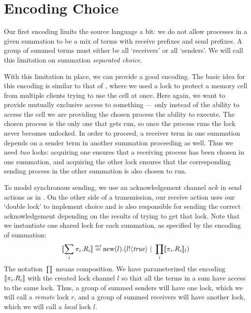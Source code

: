 \section{Encoding Choice}\label{failedencoding}
Our first encoding limits the source language a bit: we do not allow processes in a given summation to be a mix of terms with receive prefixes and send prefixes.  
A group of summed terms must either be all `receivers' or all `senders'.  
We will call this limitation on summation \emph{separated choice}.

With this limitation in place, we can provide a good encoding.  
The basic idea for this encoding is similar to that of , where we used a lock to protect a memory cell from multiple clients trying to use the cell at once.  
Here again, we want to provide mutually exclusive access to something --- only instead of the ability to access the cell we are providing the chosen process the ability to execute.  
The chosen process is the only one that gets run, so once the process runs the lock never becomes unlocked.  
In order to proceed, a receiver term in one summation depends on a sender term in another summation proceeding as well.
Thus we need \emph{two} locks: acquiring one ensures that a receiving process has been chosen in one summation, and acquiring the other lock ensures that the corresponding sending process in the other summation is also chosen to run.

To model synchronous sending, we use an acknowledgement channel $ack$ in send actions as in .  On the other side of a transmission, our receive action uses our `double lock' to implement choice and is also responsible for sending the correct acknowledgement depending on the results of trying to get that lock.  Note that we instantiate one shared lock for each summation, as specified by the encoding of summation:
\[
	\llbracket{\displaystyle\sum_{i} \pi_i.R_i}\rrbracket \overset{\mbox{\tiny{def}}}{=} \text{new}({l}).({l}!\langle{ \ensuremath{\text{\emph{true}}} }\rangle \ |\  \displaystyle\prod_{i}\llbracket{\pi_i.R_i}\rrbracket_l)
\]
The notation $\prod$ means composition.  We have parameterized the encoding $\llbracket{\pi_i.R_i}\rrbracket$ with the created lock channel $l$ so that all the terms in a sum have access to the same lock.  Thus, a group of summed senders will have one lock, which we will call a \emph{remote} lock $r$, and a group of summed receivers will have another lock, which we will call a \emph{local} lock $l$.

